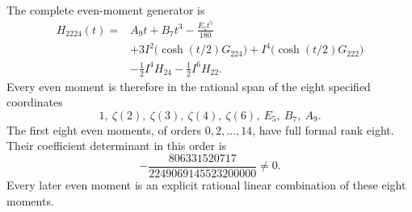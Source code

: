 \begin{theorem}
\label{mtp:quartic}
The complete even-moment generator is
\begin{equation}\label{mtp:H2224}
 \boxed{\begin{aligned}
 H_{2224}(t)={}&A_9t+B_7t^3-\frac{E_5t^5}{180}\\
 &+3I^2\bigl(\cosh(t/2)G_{224}\bigr)
       +I^4\bigl(\cosh(t/2)G_{222}\bigr)\\
 &-\frac12I^4H_{24}-\frac12I^6H_{22}.
 \end{aligned}}
\end{equation}
Every even moment is therefore in the rational span of the eight
specified coordinates
\begin{equation}\label{mtp:quartic-coordinates}
                1,\ \zeta(2),\ \zeta(3),\ \zeta(4),\ \zeta(6),\ E_5,\ B_7,\ A_9.
\end{equation}
The first eight even moments, of orders $0,2,\ldots,14$, have full
formal rank eight. Their coefficient determinant in this order is
\begin{equation}\label{mtp:quartic-determinant}
                      -\frac{806331520717}{2249069145523200000}\ne0.
\end{equation}
Every later even moment is an explicit rational linear combination
of these eight moments.
\end{theorem}

